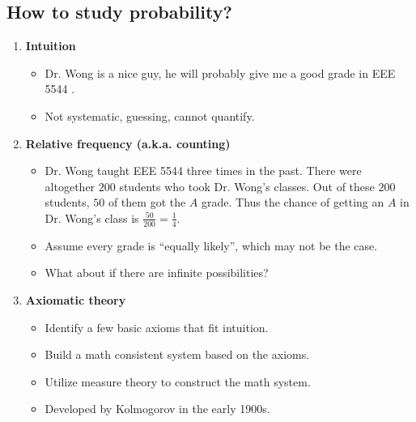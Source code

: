 \subsection{How to study probability?}
\begin{enumerate}
\item \textbf{Intuition}
\begin{itemize}
\item {} Dr. Wong is a nice guy, he will probably give me a good grade in EEE 5544 .
\item Not systematic, guessing, cannot quantify.
\end{itemize}

\item \textbf{Relative frequency (a.k.a. counting)} 
\begin{itemize}
\item \textbf{} Dr. Wong taught EEE 5544 three times in the
  past. There were altogether $200$ students who took Dr. Wong's
  classes. Out of these $200$ students, $50$ of them got the \(A\) grade.
  Thus the chance of getting an \(A\) in Dr. Wong's class is
  \(\frac{50}{200}=\frac{1}{4}\).
\item Assume every grade is ``equally likely'', which may not be the case.
\item What about if there are infinite possibilities?
\end{itemize}

\item \textbf{Axiomatic theory} 
\begin{itemize}
  \item Identify a few basic axioms that fit intuition.
  \item Build a math consistent system based on the axioms.
  \item Utilize measure theory to construct the math system.
  \item Developed by Kolmogorov in the early 1900s.
\end{itemize}
\end{enumerate}
